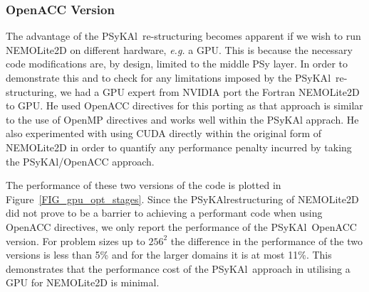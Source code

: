\documentclass[journal]{IEEEtran}
\newcommand{\psykal}{{PS}y{KA}l}
\begin{document}


\subsubsection{OpenACC Version}

The advantage of the \psykal\ re-structuring becomes apparent if we
wish to run NEMOLite2D on different hardware, \textit{e.g.} a
GPU. This is because the necessary code modifications are, by design,
limited to the middle PSy layer. In order to demonstrate this and to
check for any limitations imposed by the \psykal\ re-structuring, we
had a GPU expert from NVIDIA port the Fortran NEMOLite2D to GPU. He
used OpenACC directives for this porting as that approach is similar
to the use of OpenMP directives and works well within the \psykal
apprach. He also experimented with using CUDA directly within the
original form of NEMOLite2D in order to quantify any performance
penalty incurred by taking the \psykal/OpenACC approach.

The performance of these two versions of the code is plotted in
Figure~\ref{FIG_gpu_opt_stages}.  Since the \psykal restructuring of
NEMOLite2D did not prove to be a barrier to achieving a performant
code when using OpenACC directives, we only report the performance of
the \psykal\ OpenACC version. For problem sizes up to $256^2$ the
difference in the performance of the two versions is less than 5\% and
for the larger domains it is at most 11\%. This demonstrates that the
performance cost of the \psykal\ approach in utilising a GPU for
NEMOLite2D is minimal.
\end{document}
